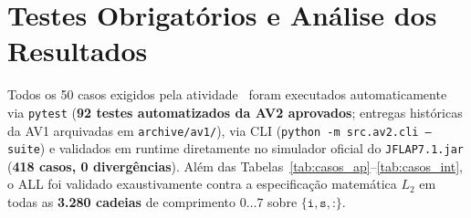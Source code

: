 \section{Testes Obrigatórios e Análise dos Resultados}

Todos os 50 casos exigidos pela atividade~\cite{atividade} foram executados automaticamente via \texttt{pytest} (\textbf{92 testes automatizados da AV2 aprovados}; entregas históricas da AV1 arquivadas em \texttt{archive/av1/}), via CLI (\texttt{python -m src.av2.cli --suite}) e validados em runtime diretamente no simulador oficial do \texttt{JFLAP7.1.jar} (\textbf{418 casos, 0 divergências}). Além das Tabelas~\ref{tab:casos_ap}--\ref{tab:casos_int}, o ALL foi validado exaustivamente contra a especificação matemática $L_2$ em todas as \textbf{3.280 cadeias} de comprimento $0 \dots 7$ sobre $\{\texttt{i}, \texttt{s}, \texttt{:}\}$.

